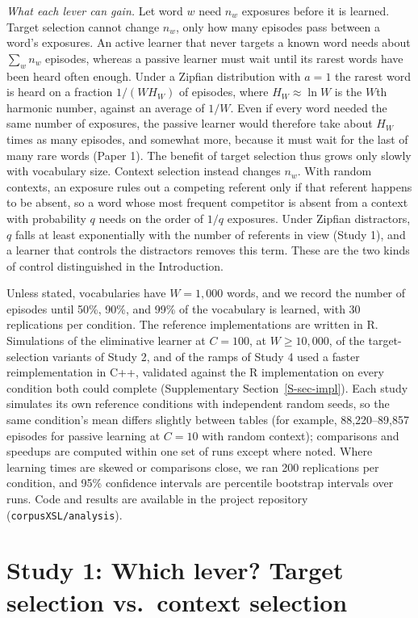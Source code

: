 \documentclass[a4paper,natbib,man]{apa6}
\begin{document}
\textit{What each lever can gain.} Let word $w$ need $n_w$ exposures before it is learned. Target selection cannot change $n_w$, only how many episodes pass between a word's exposures. An active learner that never targets a known word needs about $\sum_w n_w$ episodes, whereas a passive learner must wait until its rarest words have been heard often enough. Under a Zipfian distribution with $a=1$ the rarest word is heard on a fraction $1/(W H_W)$ of episodes, where $H_W \approx \ln W$ is the $W$th harmonic number, against an average of $1/W$. Even if every word needed the same number of exposures, the passive learner would therefore take about $H_W$ times as many episodes, and somewhat more, because it must wait for the last of many rare words (Paper 1). The benefit of target selection thus grows only slowly with vocabulary size. Context selection instead changes $n_w$. With random contexts, an exposure rules out a competing referent only if that referent happens to be absent, so a word whose most frequent competitor is absent from a context with probability $q$ needs on the order of $1/q$ exposures. Under Zipfian distractors, $q$ falls at least exponentially with the number of referents in view (Study 1), and a learner that controls the distractors removes this term. These are the two kinds of control distinguished in the Introduction.

Unless stated, vocabularies have $W=1{,}000$ words, and we record the number of episodes until 50\%, 90\%, and 99\% of the vocabulary is learned, with 30 replications per condition. The reference implementations are written in R. Simulations of the eliminative learner at $C=100$, at $W \ge 10{,}000$, of the target-selection variants of Study 2, and of the ramps of Study 4 used a faster reimplementation in C++, validated against the R implementation on every condition both could complete (Supplementary Section~\ref{S-sec-impl}). Each study simulates its own reference conditions with independent random seeds, so the same condition's mean differs slightly between tables (for example, 88,220--89,857 episodes for passive learning at $C=10$ with random context); comparisons and speedups are computed within one set of runs except where noted. Where learning times are skewed or comparisons close, we ran 200 replications per condition, and 95\% confidence intervals are percentile bootstrap intervals over runs. Code and results are available in the project repository (\texttt{corpusXSL/analysis}).

\section{Study 1: Which lever? Target selection vs.\ context selection}
\label{sec-context}
\end{document}
